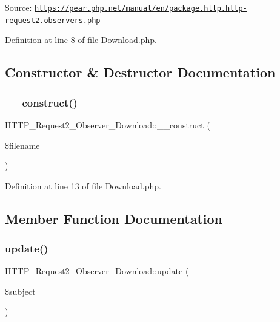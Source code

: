 Source\+: \href{https://pear.php.net/manual/en/package.http.http-request2.observers.php}{\tt https\+://pear.\+php.\+net/manual/en/package.\+http.\+http-\/request2.\+observers.\+php} 

Definition at line 8 of file Download.\+php.



\subsection{Constructor \& Destructor Documentation}
\hypertarget{classHTTP__Request2__Observer__Download_a67e1f188f88776fa87dc69280ad41ea1}{}\label{classHTTP__Request2__Observer__Download_a67e1f188f88776fa87dc69280ad41ea1} 
\subsubsection{\texorpdfstring{\+\_\+\+\_\+construct()}{\_\_construct()}}
{\footnotesize\ttfamily H\+T\+T\+P\+\_\+\+Request2\+\_\+\+Observer\+\_\+\+Download\+::\+\_\+\+\_\+construct (\begin{DoxyParamCaption}\item[{}]{\$filename }\end{DoxyParamCaption})}



Definition at line 13 of file Download.\+php.



\subsection{Member Function Documentation}
\hypertarget{classHTTP__Request2__Observer__Download_a5be07b74ddd29343e85fed87bef999eb}{}\label{classHTTP__Request2__Observer__Download_a5be07b74ddd29343e85fed87bef999eb} 
\subsubsection{\texorpdfstring{update()}{update()}}
{\footnotesize\ttfamily H\+T\+T\+P\+\_\+\+Request2\+\_\+\+Observer\+\_\+\+Download\+::update (\begin{DoxyParamCaption}\item[{Spl\+Subject}]{\$subject }\end{DoxyParamCaption})}



